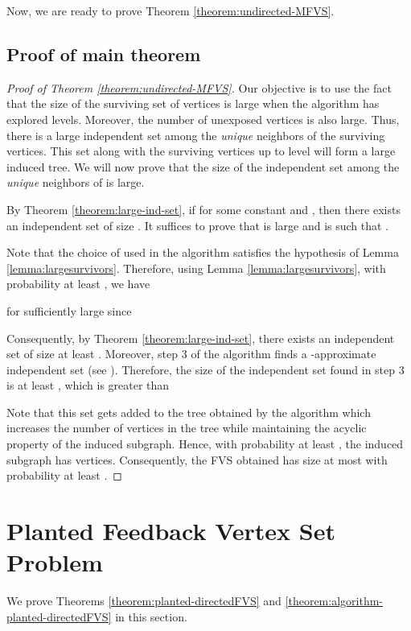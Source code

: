 \documentclass[11pt]{article}
\begin{document}
Now, we are ready to prove Theorem \ref{theorem:undirected-MFVS}.

\subsection{Proof of main theorem}
\begin{proof} [Proof of Theorem \ref{theorem:undirected-MFVS}]
Our objective is to use the fact that the size of the surviving set of vertices is large when the algorithm has explored  levels. Moreover, the number of unexposed vertices is also large. Thus, there is a large independent set among the \emph{unique} neighbors of the surviving vertices. This set along with the surviving vertices up to level  will form a large induced tree. We will now prove that the size of the independent set among the \emph{unique} neighbors of  is large.

By Theorem \ref{theorem:large-ind-set}, if  for some constant  and , then there exists an independent set of size . It suffices to prove that  is large and is such that .

Note that the choice of  used in the algorithm satisfies the hypothesis of Lemma \ref{lemma:largesurvivors}. Therefore, using Lemma \ref{lemma:largesurvivors}, with probability at least , we have

for sufficiently large  since


Consequently, by Theorem \ref{theorem:large-ind-set}, there exists an independent set of size at least . Moreover, step 3 of the algorithm finds a -approximate independent set (see \cite{grimmett-diarmid-1975,diarmid-1984}). Therefore, the size of the independent set found in step 3 is at least , which is greater than

Note that this set gets added to the tree obtained by the algorithm which increases the number of vertices in the tree while maintaining the acyclic property of the induced subgraph. Hence, with probability at least , the induced subgraph has  vertices. Consequently, the FVS obtained has size at most  with probability at least .

\end{proof}


\section{Planted Feedback Vertex Set Problem}
We prove Theorems \ref{theorem:planted-directedFVS} and \ref{theorem:algorithm-planted-directedFVS} in this section.
\end{document}

